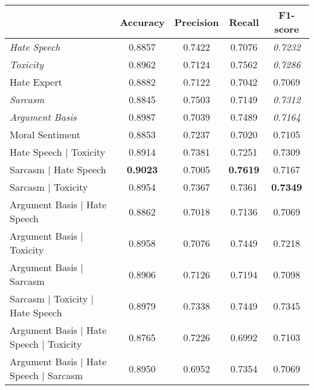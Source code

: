 \begin{table}[]
  \begin{tabular}{l|cccc}
                                                      & Accuracy        & Precision & Recall          & F1-score        \\ \hline
    \textit{Hate Speech}                              & 0.8857          & 0.7422    & 0.7076          & \textit{0.7232} \\
    \textit{Toxicity}                                 & 0.8962          & 0.7124    & 0.7562          & \textit{0.7286} \\
    Hate Expert                                       & 0.8882          & 0.7122    & 0.7042          & 0.7069          \\
    \textit{Sarcasm}                                  & 0.8845          & 0.7503    & 0.7149          & \textit{0.7312} \\
    \textit{Argument Basis}                           & 0.8987          & 0.7039    & 0.7489          & \textit{0.7164} \\
    Moral Sentiment                                   & 0.8853          & 0.7237    & 0.7020          & 0.7105          \\
    Hate Speech | Toxicity                            & 0.8914          & 0.7381    & 0.7251          & 0.7309          \\
    Sarcasm | Hate Speech                             & \textbf{0.9023} & 0.7005    & \textbf{0.7619} & 0.7167          \\
    Sarcasm | Toxicity                                & 0.8954          & 0.7367    & 0.7361          & \textbf{0.7349} \\
    Argument Basis | Hate Speech                      & 0.8862          & 0.7018    & 0.7136          & 0.7069          \\
    Argument Basis | Toxicity                         & 0.8958          & 0.7076    & 0.7449          & 0.7218          \\
    Argument Basis | Sarcasm                          & 0.8906          & 0.7126    & 0.7194          & 0.7098          \\
    Sarcasm | Toxicity | Hate Speech                  & 0.8979          & 0.7338    & 0.7449          & 0.7345          \\
    Argument Basis | Hate Speech | Toxicity           & 0.8765          & 0.7226    & 0.6992          & 0.7103          \\
    Argument Basis | Hate Speech | Sarcasm            & 0.8950          & 0.6952    & 0.7354          & 0.7069          \\

\end{tabular}
\end{table}
